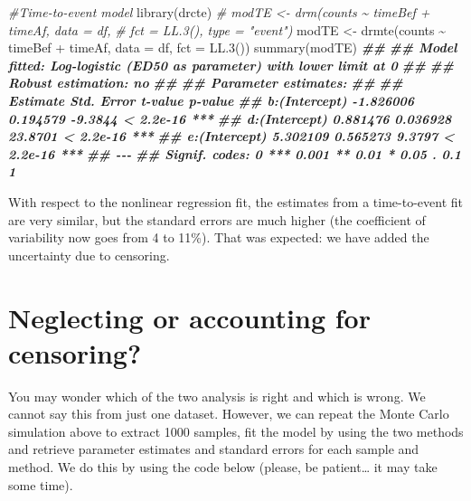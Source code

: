 \documentclass[
]{book}
\newenvironment{Shaded}{\begin{snugshade}}{\end{snugshade}}
\newcommand{\AttributeTok}[1]{\textcolor[rgb]{0.77,0.63,0.00}{#1}}
\newcommand{\CommentTok}[1]{\textcolor[rgb]{0.56,0.35,0.01}{\textit{#1}}}
\newcommand{\DocumentationTok}[1]{\textcolor[rgb]{0.56,0.35,0.01}{\textbf{\textit{#1}}}}
\newcommand{\FunctionTok}[1]{\textcolor[rgb]{0.00,0.00,0.00}{#1}}
\newcommand{\NormalTok}[1]{#1}
\newcommand{\OtherTok}[1]{\textcolor[rgb]{0.56,0.35,0.01}{#1}}
\newcommand{\SpecialCharTok}[1]{\textcolor[rgb]{0.00,0.00,0.00}{#1}}
\begin{document}
\begin{Shaded}
\begin{Highlighting}[]
\CommentTok{\#Time{-}to{-}event model}
\FunctionTok{library}\NormalTok{(drcte)}
\CommentTok{\# modTE \textless{}{-} drm(counts \textasciitilde{} timeBef + timeAf, data = df, }
\CommentTok{\#            fct = LL.3(), type = "event")}
\NormalTok{modTE }\OtherTok{\textless{}{-}} \FunctionTok{drmte}\NormalTok{(counts }\SpecialCharTok{\textasciitilde{}}\NormalTok{ timeBef }\SpecialCharTok{+}\NormalTok{ timeAf, }\AttributeTok{data =}\NormalTok{ df, }
           \AttributeTok{fct =} \FunctionTok{LL.3}\NormalTok{())}
\FunctionTok{summary}\NormalTok{(modTE)}
\DocumentationTok{\#\# }
\DocumentationTok{\#\# Model fitted: Log{-}logistic (ED50 as parameter) with lower limit at 0}
\DocumentationTok{\#\# }
\DocumentationTok{\#\# Robust estimation: no }
\DocumentationTok{\#\# }
\DocumentationTok{\#\# Parameter estimates:}
\DocumentationTok{\#\# }
\DocumentationTok{\#\#                Estimate Std. Error t{-}value   p{-}value    }
\DocumentationTok{\#\# b:(Intercept) {-}1.826006   0.194579 {-}9.3844 \textless{} 2.2e{-}16 ***}
\DocumentationTok{\#\# d:(Intercept)  0.881476   0.036928 23.8701 \textless{} 2.2e{-}16 ***}
\DocumentationTok{\#\# e:(Intercept)  5.302109   0.565273  9.3797 \textless{} 2.2e{-}16 ***}
\DocumentationTok{\#\# {-}{-}{-}}
\DocumentationTok{\#\# Signif. codes:  0 \textquotesingle{}***\textquotesingle{} 0.001 \textquotesingle{}**\textquotesingle{} 0.01 \textquotesingle{}*\textquotesingle{} 0.05 \textquotesingle{}.\textquotesingle{} 0.1 \textquotesingle{} \textquotesingle{} 1}
\end{Highlighting}
\end{Shaded}

With respect to the nonlinear regression fit, the estimates from a time-to-event fit are very similar, but the standard errors are much higher (the coefficient of variability now goes from 4 to 11\%). That was expected: we have added the uncertainty due to censoring.

\hypertarget{neglecting-or-accounting-for-censoring}{%
\section{Neglecting or accounting for censoring?}\label{neglecting-or-accounting-for-censoring}}

You may wonder which of the two analysis is right and which is wrong. We cannot say this from just one dataset. However, we can repeat the Monte Carlo simulation above to extract 1000 samples, fit the model by using the two methods and retrieve parameter estimates and standard errors for each sample and method. We do this by using the code below (please, be patient\ldots{} it may take some time).
\end{document}
